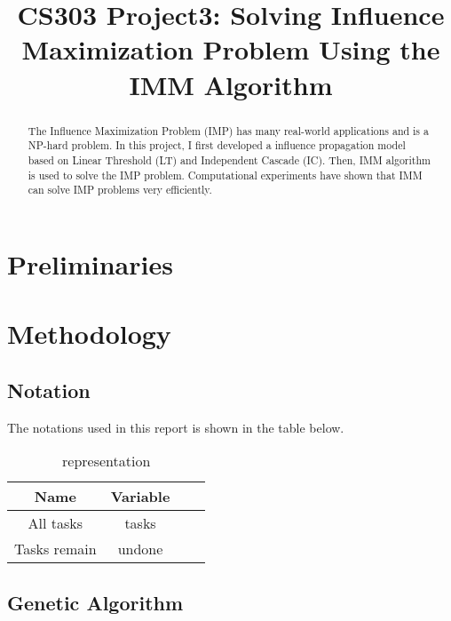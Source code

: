 \documentclass[conference]{IEEEtran}
\begin{document}
  
  \title{CS303 Project3: Solving Influence Maximization Problem Using the IMM Algorithm}
  
  \author{
  }
  
  \maketitle
  
  \begin{abstract}
  The Influence Maximization Problem (IMP) has many real-world applications and is a NP-hard problem. In this project, I first developed a influence propagation model based on Linear Threshold (LT) and Independent Cascade (IC). Then, IMM algorithm is used to solve the IMP problem. Computational experiments have shown that IMM can solve IMP problems very efficiently.
  \end{abstract}
  \IEEEpeerreviewmaketitle
  
  \section{Preliminaries}

  
\section{Methodology}

\subsection{Notation}
The notations used in this report is shown in the table below.
    \begin{table}[H]
	\caption{representation}
	\centering
    \begin{tabular}{cccc}
    \toprule
    Name&Variable\\
    \midrule
    All tasks&tasks\\
    Tasks remain&undone\\
	\bottomrule
	\end{tabular}
	\label{table:1}
	\end{table}
\subsection{Genetic Algorithm}
\end{document}
